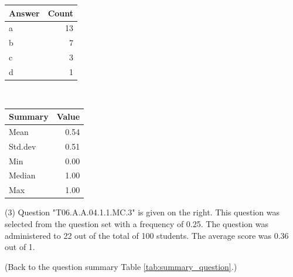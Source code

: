 \documentclass[12pt,nohyper]{tufte-handout}\usepackage[]{graphicx}\usepackage[]{color}
\begin{document}
\begin{center}%
\begin{tabular}{lr}
  \hline
Answer & Count \\ 
  \hline
a &  13 \\ 
  b &   7 \\ 
  c &   3 \\ 
  d &   1 \\ 
   \hline
\end{tabular}
~~~~~~~~%
\begin{tabular}{lr}
  \hline
Summary & Value \\ 
  \hline
Mean & 0.54 \\ 
  Std.dev & 0.51 \\ 
  Min & 0.00 \\ 
  Median & 1.00 \\ 
  Max & 1.00 \\ 
   \hline
\end{tabular}
\end{center}\newpage{} (3) Question "T06.A.A.04.1.1.MC.3" is given on the right. This question was selected from the question set with a frequency of 0.25. The question was administered to 22 out of the total of 100 students. The average score was 0.36 out of 1.

 (Back to the question summary Table \ref{tab:summary_question}.)
\end{document}
